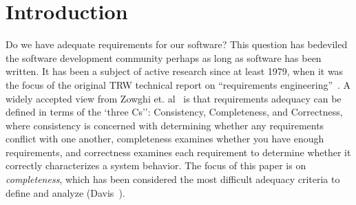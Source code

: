 \section{Introduction}
\label{sec:intro}
Do we have adequate requirements for our software?  This question has bedeviled the software development community perhaps as long as software has been written.  It has been a subject of active research since at least 1979, when it was the focus of the original TRW technical report on ``requirements engineering''~\cite{}.  A widely accepted view from Zowghi et. al~\cite{Zowghi} is that requirements adequacy can be defined in terms of the `three Cs'': Consistency, Completeness, and Correctness, where consistency is concerned with determining whether any requirements conflict with one another, completeness examines whether you have enough requirements, and correctness examines each requirement to determine whether it correctly characterizes a system behavior.  The focus of this paper is on {\em completeness}, which has been considered the most difficult adequacy criteria to define and analyze (Davis~\cite{}).




